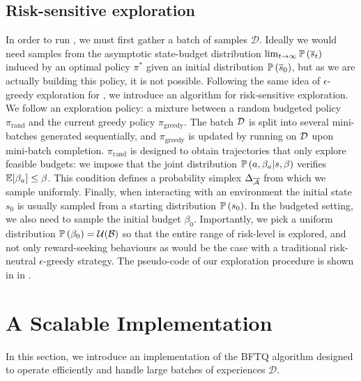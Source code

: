 \documentclass{article}
\begin{document}
\subsection{Risk-sensitive exploration}
\label{sec:exploration}

In order to run , we must first gather a batch of samples $\mathcal{D}$. Ideally we would need samples from the asymptotic state-budget distribution $\lim_{t\rightarrow\infty}\mathbb{P}\left(\overline{s}_t\right)$ induced by an optimal policy $\pi^*$ given an initial distribution $\mathbb{P}\left(\overline{s}_0\right)$, but as we are actually building this policy, it is not possible. Following the same idea of $\epsilon$-greedy exploration for \FTQ \citep{Ernst2005,Riedmiller2005}, we introduce an algorithm for risk-sensitive exploration. We follow an exploration policy: a mixture between a random budgeted policy $\pi_\text{rand}$ and the current greedy policy $\pi_\text{greedy}$. The batch $\mathcal{D}$ is split into several mini-batches generated sequentially, and $\pi_\text{greedy}$ is updated by running  on $\mathcal{D}$ upon mini-batch completion. $\pi_\text{rand}$ is designed to obtain trajectories that only explore feasible budgets: we impose that the joint distribution $\mathbb{P}\left(a, \beta_a|s, \beta\right)$ verifies $\operatorname*{\mathbb{E}}[\beta_a]\leq\beta$. This condition defines a probability simplex $\Delta_{\overline{\mathcal{A}}}$ from which we sample uniformly. Finally, when interacting with an environment the initial state $s_0$ is usually sampled from a starting distribution $\mathbb{P}\left(s_0\right)$. In the budgeted setting, we also need to sample the initial budget $\beta_0$. Importantly, we pick a uniform distribution $\mathbb{P}\left(\beta_0\right) = \mathcal{U}(\mathcal{B})$ so that the entire range of risk-level is explored, and not only reward-seeking behaviours as would be the case with a traditional risk-neutral $\epsilon$-greedy strategy. The pseudo-code of our exploration procedure is shown in  in .

\section{A Scalable Implementation}
\label{sec:scalable-bftq}
In this section, we introduce an implementation of the BFTQ algorithm designed to operate efficiently and handle large batches of experiences $\mathcal{D}$.
\end{document}
